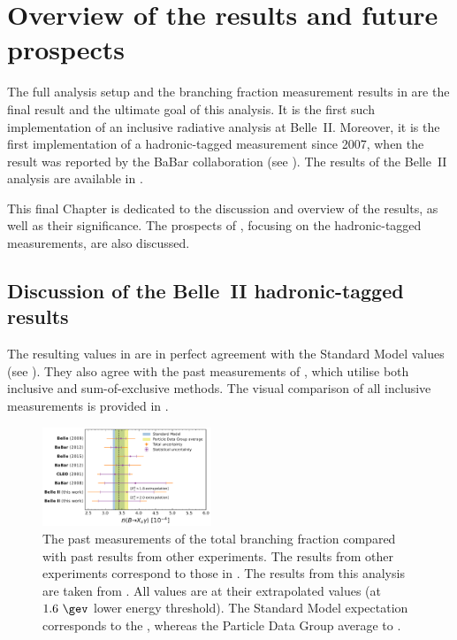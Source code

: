 \chapter{Overview of the results and future prospects}\label{ch:overview}

The full analysis setup and the branching fraction measurement results in 
are the final result and the ultimate goal of this analysis.
It is the first such implementation of an inclusive radiative analysis at Belle~II.
Moreover, it is the first implementation of a hadronic-tagged \BtoXsgamma measurement since 2007, 
when the result was reported by the BaBar collaboration (see ).
The results of the Belle~II analysis are available in \cite{Belle-II:2022hys}.

This final Chapter is dedicated to the discussion and overview of the results, as well as their significance.
The prospects of \BtoXsgamma, focusing on the hadronic-tagged measurements, are also discussed.

\section{Discussion of the Belle~II hadronic-tagged \texorpdfstring{\BtoXsgamma}{B->Xs gamma} results}\label{sec:result_discussion}

The resulting values in  are in perfect agreement with the Standard Model values (see ).
They also agree with the past measurements of \BtoXsgamma, which utilise both inclusive and sum-of-exclusive methods.
The visual comparison of all inclusive measurements is provided in .
\begin{figure}[htbp!]
    \centering
    \includegraphics[width=0.45\textwidth]{figures/results_discussion/all_measurements_compared.pdf}
    \caption{\label{fig:measurement_comparison}
        The past measurements of the total branching fraction compared with past results from other experiments.
        The results from other experiments correspond to those in .
        The results from this analysis are taken from .
        All values are at their extrapolated values (at $1.6~\gev$ lower energy threshold).
        The Standard Model expectation corresponds to the ,
        whereas the Particle Data Group average to .
    }
\end{figure}

